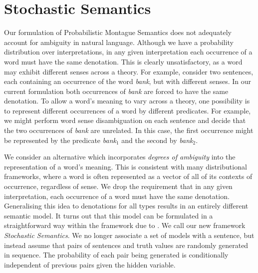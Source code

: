 \documentclass[a4paper,11pt]{article}
\newcommand{\newcite}[1]{\citet{#1}}
\theoremstyle{definition}
\begin{document}
\section{Stochastic Semantics}

Our formulation of Probabilistic Montague Semantics
does not adequately account for ambiguity in natural language.
Although we have a probability distribution over
interpretations, 
in any given interpretation each occurrence of a
word must have the same denotation. This is clearly unsatisfactory, as a
word may exhibit different senses across a
theory. For example, consider two sentences, each
containing  an occurrence of the word \emph{bank}, but with different senses. In our current
formulation both occurrences of \emph{bank} are forced to have the same denotation. To allow
a word's meaning 
to vary across a theory, one possibility
is to represent
different occurrences of a word by different
predicates. For example, we might perform word sense disambiguation on
each sentence and decide that the two occurrences of \emph{bank} are
unrelated. In this case, the first occurrence might be
represented by the predicate {\em bank}$_1$ and the second by {\em
  bank}$_2$.




We consider an alternative which incorporates \emph{degrees of ambiguity} into the representation of a word's meaning. This is consistent with many distributional  frameworks, where a word is often represented as a vector of all of its contexts of occurrence, regardless of sense. 
We drop the requirement that in any given interpretation, each occurrence of a word must have the same denotation. Generalising this idea to denotations for all types results in an entirely different semantic model. It turns out that this model can be formulated in a straightforward way within the framework due to \newcite{Sato:97}. We call our new framework \emph{Stochastic Semantics}.  We no longer
associate a set of models with a sentence, but instead assume that pairs of sentences and
truth values are randomly generated in sequence. The probability of
each pair being generated is conditionally independent of previous
pairs given the hidden variable.
\end{document}
